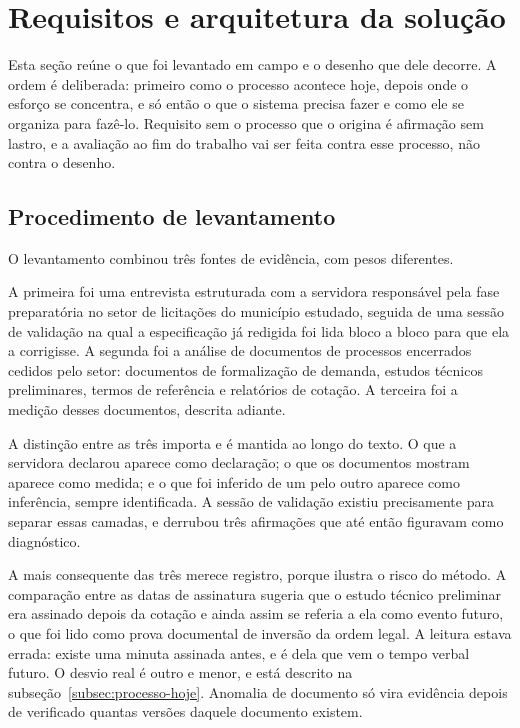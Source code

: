 \section{Requisitos e arquitetura da solução}
\label{sec:requisitos-arquitetura}

Esta seção reúne o que foi levantado em campo e o desenho que dele decorre. A
ordem é deliberada: primeiro como o processo acontece hoje, depois onde o esforço
se concentra, e só então o que o sistema precisa fazer e como ele se organiza
para fazê-lo. Requisito sem o processo que o origina é afirmação sem lastro, e a
avaliação ao fim do trabalho vai ser feita contra esse processo, não contra o
desenho.

\subsection{Procedimento de levantamento}
\label{subsec:procedimento-levantamento}

O levantamento combinou três fontes de evidência, com pesos diferentes.

A primeira foi uma entrevista estruturada com a servidora responsável pela fase
preparatória no setor de licitações do município estudado, seguida de uma sessão
de validação na qual a especificação já redigida foi lida bloco a bloco para que
ela a corrigisse. A segunda foi a análise de documentos de processos encerrados
cedidos pelo setor: documentos de formalização de demanda, estudos técnicos
preliminares, termos de referência e relatórios de cotação. A terceira foi a
medição desses documentos, descrita adiante.

A distinção entre as três importa e é mantida ao longo do texto. O que a
servidora declarou aparece como declaração; o que os documentos mostram aparece
como medida; e o que foi inferido de um pelo outro aparece como inferência,
sempre identificada. A sessão de validação existiu precisamente para separar
essas camadas, e derrubou três afirmações que até então figuravam como
diagnóstico.

A mais consequente das três merece registro, porque ilustra o risco do método.
A comparação entre as datas de assinatura sugeria que o estudo técnico
preliminar era assinado depois da cotação e ainda assim se referia a ela como
evento futuro, o que foi lido como prova documental de inversão da ordem legal.
A leitura estava errada: existe uma minuta assinada antes, e é dela que vem o
tempo verbal futuro. O desvio real é outro e menor, e está descrito na
subseção~\ref{subsec:processo-hoje}. Anomalia de documento só vira evidência
depois de verificado quantas versões daquele documento existem.


